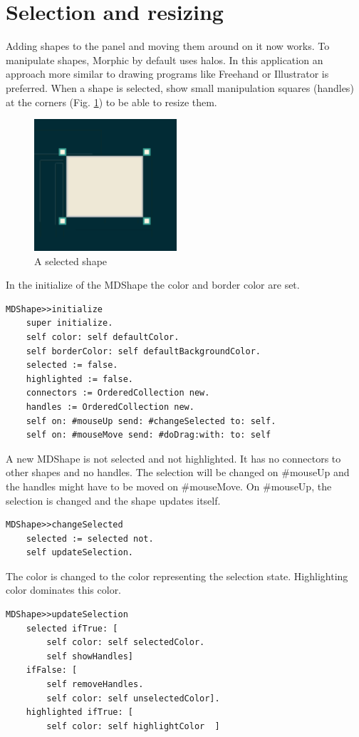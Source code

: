 \documentclass[10pt]{article}   	%
\begin{document}
\section{Selection and resizing}
Adding shapes to the panel and moving them around on it now works.
To manipulate shapes, Morphic by default uses halos. In this application
an approach more similar to drawing programs like Freehand or Illustrator
is preferred. When a shape is selected, show small manipulation squares
(handles) at the corners (Fig. \ref{selectedShape}) to be able to resize them.
\begin{figure}[htb]
\begin{center}
\includegraphics[width=150pt]{SelectedShape.png}
\caption{A selected shape}
\label{selectedShape}
\end{center}
\end{figure}
In the initialize of the MDShape the color and border color
are set.
\begin{verbatim}
MDShape>>initialize
    super initialize.
    self color: self defaultColor.
    self borderColor: self defaultBackgroundColor.
    selected := false.
    highlighted := false.
    connectors := OrderedCollection new.
    handles := OrderedCollection new.
    self on: #mouseUp send: #changeSelected to: self.
    self on: #mouseMove send: #doDrag:with: to: self
\end{verbatim}
A new MDShape is not selected and not highlighted.
It has no connectors to other shapes and no handles.
The selection will be changed on \#mouseUp and 
the handles might have to be moved on \#mouseMove.
On \#mouseUp, the selection is changed and the shape
updates itself. 
\begin{verbatim}
MDShape>>changeSelected
    selected := selected not.
    self updateSelection. 
\end{verbatim}
The color is changed to the color representing the 
selection state. Highlighting color dominates this color.
\begin{verbatim}
MDShape>>updateSelection
    selected ifTrue: [ 
        self color: self selectedColor.
        self showHandles]
    ifFalse: [ 
        self removeHandles.
        self color: self unselectedColor].
    highlighted ifTrue: [ 
        self color: self highlightColor  ]
\end{verbatim}
\end{document}
